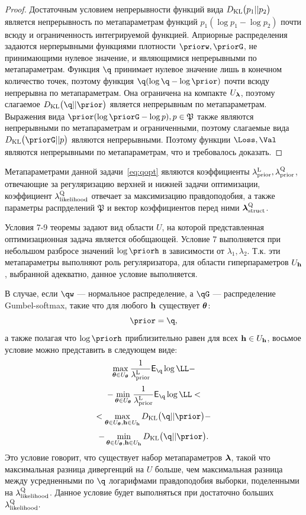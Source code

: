 \begin{proof}
Достаточным условием непрерывности функций вида $D_\text{KL}\bigl(p_1 || p_2\bigr)$ является непрерывность по метапараметрам функций $p_1 (\log{p_1} - \log{p_2})$  почти всюду и ограниченность интегрируемой функцией.  Априорные распределения задаются нерперывными функциями плотности $\priorw, \priorG$, не принимающими нулевое значение, и являющимися непрерывными по метапараметрам. Функция $\q$ принимает нулевое значение лишь в конечном количество точек, поэтому функция $\q (\log \q - \log \prior)$ почти всюду непрерывна по метапараметрам.  Она ограничена на компакте $U_{\boldsymbol{\lambda}}$, поэтому слагаемое $\KL{\q}{\prior}$ является непрерывным по метапараметрам.
Выражения вида $\prior (\log \priorG - \log p), p \in \mathfrak{P}$ также являются непрерывными по метапараметрам и ограниченными, поэтому слагаемые вида $\KL{\priorG}{p}$ являются непрерывными. Поэтому функции $\Loss, \Val$ являются непрерывными по метапараметрам, что и требовалось доказать.
\end{proof}
Метапараметрами данной задачи~\eqref{eq:qopt} являются коэффициенты $\lambda_\text{prior}^\text{L}, \lambda_\text{prior}^\text{Q}$, отвечающие за регуляризацию верхней и нижней задачи оптимизации, коэффициент $\lambda_\text{likelihood}^\text{Q}$ отвечает за максимизацию правдоподобия, а также параметры распрделений $\mathfrak{P}$ и вектор коэффициентов перед ними $\boldsymbol{\lambda}_\text{struct}^\text{Q}$. 

Условия 7-9 теоремы задают вид области $U$, на которой представленная оптимизационная задача является обобщающей. 
Условие 7 выполняется при небольшом разбросе значений $\log \priorh$ в зависимости от $\lambda_1, \lambda_2$. Т.к. эти метапараметры выполняют роль регуляризатора, для области гиперпараметров $U_{\mathbf{h}}$, выбранной адекватно, данное условие выполняется.

В случае, если $\qw$ --- нормальное распределение, а $\qG$ --- распределение Gumbel-softmax, такие что для любого $\mathbf{h}$ существует $\boldsymbol{\theta}$:
\[
    \prior = \q,
\]
а также полагая что $\log\priorh$ приблизительно равен для всех $\mathbf{h} \in U_{\mathbf{h}}$, восьмое условие можно представить в следующем виде:
\[
\max_{\teta \in \Uteta}\frac{1}{\lamCL}\E_{\q} \log \LL - 
\]
\[
 - \min_{\teta \in \Uteta}\frac{1}{\lamCL}\E_{\q} \log \LL  <
\]
\[ 
< \max_{\teta \in \Uteta, \h \in \Uh} \KL{\q}{\prior} -
\]
\[
-\min_{\teta \in \Uteta, \h \in \Uh} \KL{\q}{\prior}.
\]
Это условие говорит, что существует набор метапараметров $\boldsymbol{\lambda}$, такой что максимальная разница дивергенций на $U$ больше, чем максимальная разница между усредненными по $\q$ логарифмами правдоподобия выборки, поделенными на $\lambda_\text{likelihood}^\text{Q}$. Данное условие будет выполняться при достаточно больших $\lambda_\text{likelihood}^\text{Q}.$

